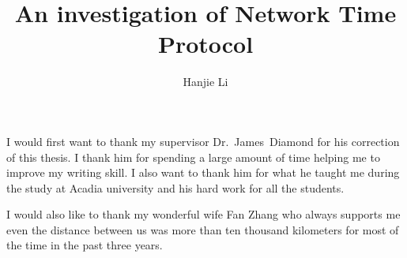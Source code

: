 

\title{An investigation of Network Time Protocol}
\author{Hanjie Li}







\firstThreePages


\Acknowledgments
I would first want to thank my supervisor Dr.~James~Diamond for his correction
of this thesis. I thank him for spending a large amount of time helping me to
improve my writing skill. I also want to thank him for what he taught me during
the study at Acadia university and his hard work for all the students.

I would also like to thank my wonderful wife Fan Zhang who always supports me
even the distance between us was more than ten thousand kilometers for most of
the time in the past three years.

